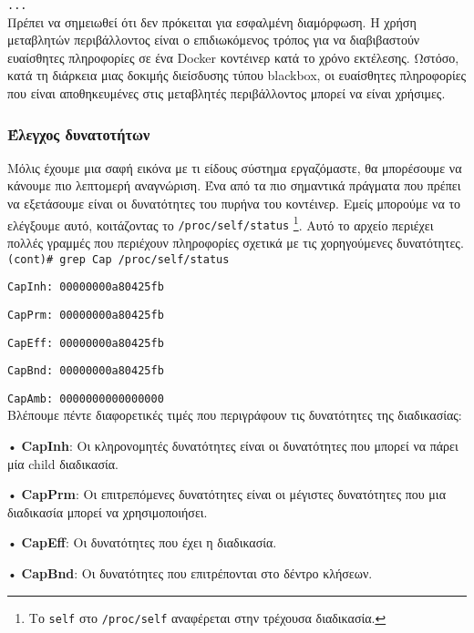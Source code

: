 \texttt{\textlatin{...}}\\

Πρέπει να σημειωθεί ότι δεν πρόκειται για εσφαλμένη διαμόρφωση. Η χρήση
μεταβλητών περιβάλλοντος είναι ο επιδιωκόμενος τρόπος για να διαβιβαστούν
ευαίσθητες πληροφορίες σε ένα \textlatin{Docker} κοντέινερ κατά το χρόνο
εκτέλεσης. Ωστόσο, κατά τη διάρκεια μιας δοκιμής διείσδυσης τύπου
\textlatin{blackbox}, οι ευαίσθητες πληροφορίες που είναι αποθηκευμένες στις
μεταβλητές περιβάλλοντος μπορεί να είναι χρήσιμες.

\subsubsection{Έλεγχος δυνατοτήτων}


Μόλις έχουμε μια σαφή εικόνα με τι είδους σύστημα εργαζόμαστε, θα μπορέσουμε να
κάνουμε πιο λεπτομερή αναγνώριση. Ένα από τα πιο σημαντικά πράγματα που πρέπει
να εξετάσουμε είναι οι δυνατότητες του πυρήνα του κοντέινερ. Εμείς μπορούμε να
το ελέγξουμε αυτό, κοιτάζοντας το \texttt{\textlatin{/proc/self/status}}
\footnote{Το \texttt{\textlatin{self}} στο \texttt{\textlatin{/proc/self}}
αναφέρεται στην τρέχουσα διαδικασία.}. Αυτό το αρχείο περιέχει πολλές γραμμές που
περιέχουν πληροφορίες σχετικά με τις χορηγούμενες δυνατότητες. \\

\texttt{\textlatin{(cont)\# grep Cap /proc/self/status}}

\texttt{\textlatin{CapInh: 00000000a80425fb}}

\texttt{\textlatin{CapPrm: 00000000a80425fb}}

\texttt{\textlatin{CapEff: 00000000a80425fb}}

\texttt{\textlatin{CapBnd: 00000000a80425fb}}

\texttt{\textlatin{CapAmb: 0000000000000000}} \\

Βλέπουμε πέντε διαφορετικές τιμές που περιγράφουν τις δυνατότητες της
διαδικασίας:

• \textlatin{\textbf{CapInh}}: Οι κληρονομητές δυνατότητες είναι οι δυνατότητες που
μπορεί να πάρει μία \textlatin{child} διαδικασία.

• \textlatin{\textbf{CapPrm}}: Οι επιτρεπόμενες δυνατότητες είναι οι μέγιστες
δυνατότητες που μια διαδικασία μπορεί να χρησιμοποιήσει.

• \textlatin{\textbf{CapEff}}: Οι δυνατότητες που έχει η διαδικασία.

• \textlatin{\textbf{CapBnd}}: Οι δυνατότητες που επιτρέπονται στο δέντρο
κλήσεων.


